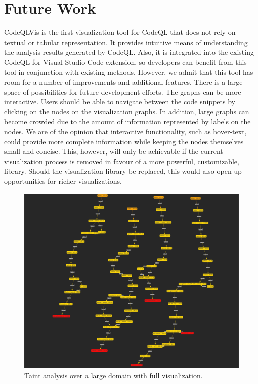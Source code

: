 \documentclass[sigplan,10pt,review]{acmart}
\begin{document}
\section{Future Work}
CodeQLVis is the first visualization tool for CodeQL that does not rely on textual or tabular representation. It provides intuitive means of understanding the analysis results generated by CodeQL. Also, it is integrated into the existing CodeQL for Visual Studio Code extension, so developers can benefit from this tool in conjunction with existing methods. However, we admit that this tool has room for a number of improvements and additional features. There is a large space of possibilities for future development efforts.
\newline
\indent The graphs can be more interactive. Users should be able to navigate between the code snippets by clicking on the nodes on the visualization graphs. In addition, large graphs can become crowded due to the amount of information represented by labels on the nodes. We are of the opinion that interactive functionality, such as hover-text, could provide more complete information while keeping the nodes themselves small and concise. This, however, will only be achievable if the current visualization process is removed in favour of a more powerful, customizable, library. Should the visualization library be replaced, this would also open up opportunities for richer visualizations.

\begin{figure}[h]
  \centering
  \includegraphics[width=\linewidth]{large_taint_full}
  \caption{Taint analysis over a large domain with full visualization.}
\end{figure}
\end{document}
